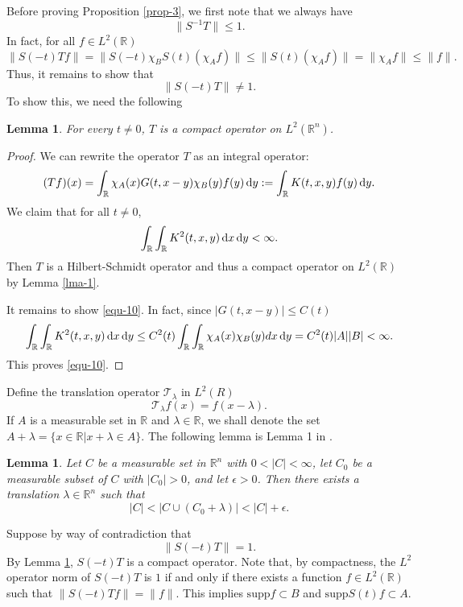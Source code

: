 \documentclass[12pt]{amsart}
\def\R {\mathbb{R}}
\def\d{{\,\rm d}}
\newtheorem{lemma}[proposition]{Lemma}
\theoremstyle{definition}
\numberwithin{equation}{section}
\begin{document}
Before proving Proposition \ref{prop-3}, we first note that we always have
$$
\|S^{-1}T\|\leq 1.
$$
In fact, for all $f\in L^2(\R)$
$$
\|S(-t)Tf\|= \|S(-t)\chi_B S(t)(\chi_Af)\|\leq \|S(t)(\chi_Af)\|=\|\chi_Af\|\leq \|f\|.
$$
Thus, it remains to show that
$$
\|S(-t)T\|\neq 1.
$$
To show this, we need the following
\begin{lemma}\label{lma-3}
For every $t\neq 0$, $T$ is a compact operator on $L^2(\R^n)$.
\end{lemma}
\begin{proof}
We can rewrite the operator $T$ as an integral operator:
$$
(Tf)(x)=\int_{\R }\chi_A(x)G(t,x-y)\chi_B(y)f(y)\d y:=\int_{\R } K(t,x,y)f(y)\d y.
$$
We claim that for all $t \neq 0$,
\begin{align}\label{equ-10}
 \int_{\R }\int_{\R } K^2(t,x,y)\d x \d y<\infty.
\end{align}
Then $T$ is a Hilbert-Schmidt operator and thus a compact operator on $L^2(\R )$ by Lemma \ref{lma-1}.

It remains to show \eqref{equ-10}. In fact, since $|G(t,x-y)|\leq C(t)$
\begin{align*}
 \int_\R\int_\R K^2(t,x,y)\d x \d y\leq  C^2(t) \int_\R\int_\R \chi_A(x)\chi_B(y)d x \d y=C^2(t)|A||B|<\infty.
\end{align*}
This proves \eqref{equ-10}.
\end{proof}

Define the translation operator $\mathcal{T}_\lambda$ in $L^2(R)$ 
\begin{equation*}
    \mathcal{T}_{\lambda}f(x)=f(x-\lambda).
\end{equation*} 
If $A$ is a measurable set in $\mathbb{R}$ and $\lambda\in \mathbb{R}$, we shall denote the set $A+\lambda=\{x\in \mathbb{R}\lvert x+\lambda \in A\}$.
The following lemma is Lemma 1 in \cite{Amrein}.
\begin{lemma}\label{lma-4} 
  Let $C$ be a measurable set in $\mathbb{R}^n$ with $0<|C|<\infty$, let $C_0$ be a measurable subset of $C$ with $|C_0|>0$, and let $\epsilon>0$. Then there exists a translation $\lambda\in \mathbb{R}^n$ such that 
  $$
  |C|<|C\cup (C_0+\lambda)|<|C|+\epsilon.
  $$
\end{lemma}


 Suppose by way of contradiction that 
\begin{equation}
    \|S(-t) T \|=1.\label{assum}
\end{equation} 
By Lemma \ref{lma-4}, $S(-t)T$ is a compact operator. Note that, by compactness, the $L^2$ operator norm of $S(-t)T$ is $1$ if and only if there exists a function $f\in L^2(\R)$ such that $\|S(-t)Tf\|=\|f\|$. This implies $\mathrm{supp}f\subset B$ and $\mathrm{supp}S(t)f\subset A$.         
\end{document}
